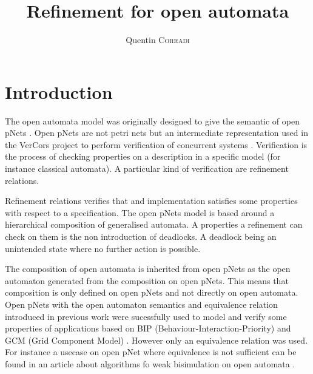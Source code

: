 \documentclass{article}
\title{Refinement for open automata}
\author{Quentin \textsc{Corradi}}
\begin{document}
\maketitle

\section{Introduction}
The open automata model was originally designed to give the semantic of open pNets \cite{2007.10770}.
Open pNets are not petri nets but an intermediate representation used in the VerCors project to perform verification of concurrent systems \cite{henrio:01252323}.
Verification is the process of checking properties on a description in a specific model (for instance classical automata).
A particular kind of verification are refinement relations.

Refinement relations verifies that and implementation satisfies some properties with respect to a specification.
The open pNets model is based around a hierarchical composition of generalised automata.
A properties a refinement can check on them is the non introduction of deadlocks.
A deadlock being an unintended state where no further action is possible.

The composition of open automata is inherited from open pNets as the open automaton generated from the composition on open pNets.
This means that composition is only defined on open pNets and not directly on open automata.
Open pNets with the open automaton semantics and equivalence relation introduced in previous work \cite{henrio:01299562} were sucessfully used to model and verify some properties of applications \cite{qin:01823507, ameurboulifa:01526055} based on BIP (Behaviour-Interaction-Priority) \cite{basu:hal-00722395} and GCM (Grid Component Model) \cite{baude:inria-00323919}.
However only an equivalence relation was used.
For instance a usecase on open pNet where equivalence is not sufficient can be found in an article about algorithms fo weak bisimulation on open automata \cite{wang:03126313}.
\end{document}
